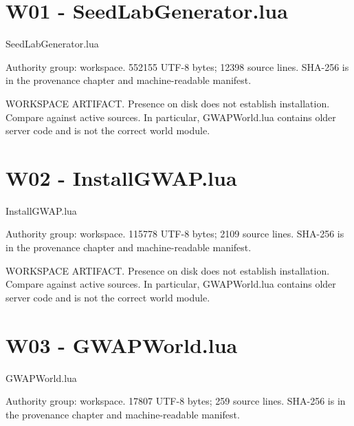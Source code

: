 \chapter{W01 - SeedLabGenerator.\allowbreak{}lua}
\label{src:W01}
SeedLabGenerator.\allowbreak{}lua

Authority group: workspace.\allowbreak{} 552155 UTF-8 bytes; 12398 source lines.\allowbreak{} SHA-256 is in the provenance chapter and machine-readable manifest.\allowbreak{}

WORKSPACE ARTIFACT.\allowbreak{} Presence on disk does not establish installation.\allowbreak{} Compare against active sources.\allowbreak{} In particular, GWAPWorld.\allowbreak{}lua contains older server code and is not the correct world module.\allowbreak{}

\begingroup{}
\endgroup
\chapter{W02 - InstallGWAP.\allowbreak{}lua}
\label{src:W02}
InstallGWAP.\allowbreak{}lua

Authority group: workspace.\allowbreak{} 115778 UTF-8 bytes; 2109 source lines.\allowbreak{} SHA-256 is in the provenance chapter and machine-readable manifest.\allowbreak{}

WORKSPACE ARTIFACT.\allowbreak{} Presence on disk does not establish installation.\allowbreak{} Compare against active sources.\allowbreak{} In particular, GWAPWorld.\allowbreak{}lua contains older server code and is not the correct world module.\allowbreak{}

\begingroup{}
\endgroup
\chapter{W03 - GWAPWorld.\allowbreak{}lua}
\label{src:W03}
GWAPWorld.\allowbreak{}lua

Authority group: workspace.\allowbreak{} 17807 UTF-8 bytes; 259 source lines.\allowbreak{} SHA-256 is in the provenance chapter and machine-readable manifest.\allowbreak{}

